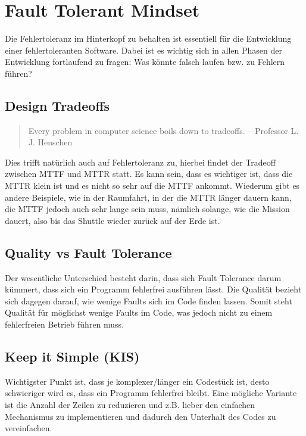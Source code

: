 \section{Fault Tolerant Mindset}
 Die Fehlertoleranz im Hinterkopf zu behalten ist essentiell für die Entwicklung einer fehlertoleranten Software. Dabei ist es wichtig sich in allen Phasen der Entwicklung fortlaufend zu fragen: Was könnte falsch laufen bzw. zu Fehlern führen?

\subsection{Design Tradeoffs}

\begin{quote}
Every problem in computer science boils down to tradeoffs.
 -- Professor L. J. Henschen
 \end{quote}
 Dies trifft natürlich auch auf Fehlertoleranz zu, hierbei findet der Tradeoff zwischen \gls{MTTF} und \gls{MTTR} statt. Es kann sein, dass es wichtiger ist, dass die \gls{MTTR} klein ist und es nicht so sehr auf die \gls{MTTF} ankommt. Wiederum gibt es andere Beispiele, wie in der Raumfahrt, in der die \gls{MTTR} länger dauern kann, die \gls{MTTF} jedoch auch sehr lange sein muss, nämlich solange, wie die Mission dauert, also bis das Shuttle wieder zurück auf der Erde ist.

\subsection{Quality vs Fault Tolerance}

Der wesentliche Unterschied besteht darin, dass sich Fault Tolerance darum kümmert, dass sich ein Programm fehlerfrei ausführen lässt. Die Qualität bezieht sich dagegen darauf, wie wenige Faults sich im Code finden lassen. Somit steht Qualität für möglichst wenige Faults im Code, was jedoch nicht zu einem fehlerfreien Betrieb führen muss.

\subsection{Keep it Simple (KIS)}

Wichtigster Punkt ist, dass je komplexer/länger ein Codestück ist, desto schwieriger wird es, dass ein Programm fehlerfrei bleibt. Eine mögliche Variante ist die Anzahl der Zeilen zu reduzieren und z.B. lieber den einfachen Mechanismus zu implementieren und dadurch den Unterhalt des Codes zu vereinfachen.

